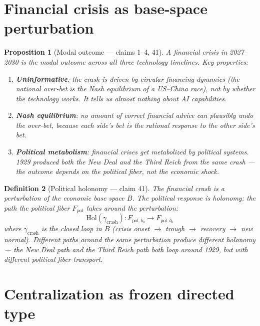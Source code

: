 \documentclass[11pt,a4paper]{article}
\newtheorem{definition}{Definition}[section]
\newtheorem{proposition}[definition]{Proposition}
\begin{document}
\section{Financial crisis as base-space perturbation}
\label{sec:crisis}

\begin{proposition}[Modal outcome --- claims 1--4, 41]
\label{prop:crash}
A financial crisis in 2027--2030 is the modal outcome across all
three technology timelines. Key properties:
\begin{enumerate}
\item \textbf{Uninformative}: the crash is driven by circular financing
  dynamics (the national over-bet is the Nash equilibrium of a US--China
  race), not by whether the technology works. It tells us almost nothing
  about AI capabilities.
\item \textbf{Nash equilibrium}: no amount of correct financial advice
  can plausibly undo the over-bet, because each side's bet is the
  rational response to the other side's bet.
\item \textbf{Political metabolism}: financial crises get metabolized by
  political systems. 1929 produced both the New Deal and the Third Reich
  from the same crash --- the outcome depends on the political fiber,
  not the economic shock.
\end{enumerate}
\end{proposition}

\begin{definition}[Political holonomy --- claim 41]
\label{def:holonomy}
The financial crash is a perturbation of the economic base space $B$.
The political response is \emph{holonomy}: the path the political fiber
$F_{\text{pol}}$ takes around the perturbation:
\[
  \text{Hol}(\gamma_{\text{crash}}) : F_{\text{pol},b_0} \to F_{\text{pol},b_0}
\]
where $\gamma_{\text{crash}}$ is the closed loop in $B$ (crisis onset
$\to$ trough $\to$ recovery $\to$ new normal). Different paths around
the same perturbation produce different holonomy --- the New Deal path
and the Third Reich path both loop around 1929, but with different
political fiber transport.
\end{definition}

\section{Centralization as frozen directed type}
\label{sec:centralization}
\end{document}

